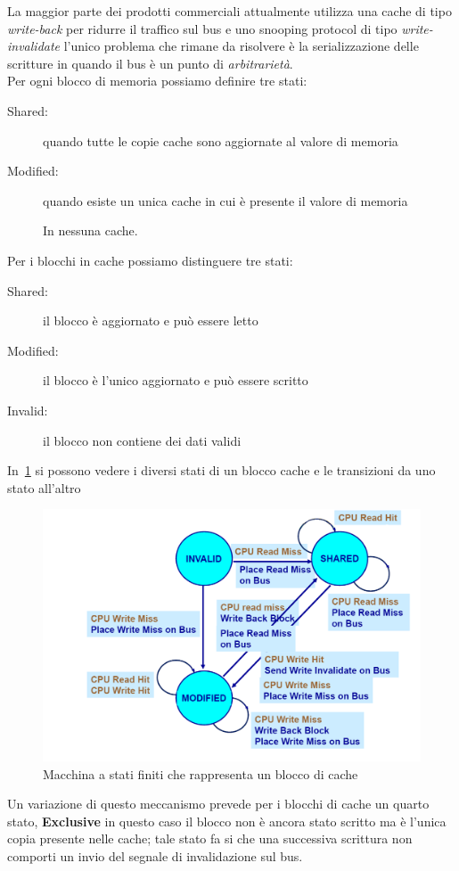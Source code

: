 La maggior parte dei prodotti commerciali attualmente utilizza una cache di tipo \emph{write-back} per ridurre il traffico sul bus e uno snooping protocol di tipo \emph{write-invalidate} l'unico problema che rimane da risolvere è la serializzazione delle scritture in quando il bus è un punto di \emph{arbitrarietà}.\\
Per ogni blocco di memoria possiamo definire tre stati:
\begin{description}
\item[Shared:] quando tutte le copie cache sono aggiornate al valore di memoria
\item[Modified:] quando esiste un unica cache in cui è presente il valore di memoria
\item[] In nessuna cache.
\end{description}
Per i blocchi in cache possiamo distinguere tre stati:
\begin{description}
\item[Shared:] il blocco è aggiornato e può essere letto
\item[Modified:] il blocco è l'unico aggiornato e può essere scritto
\item[Invalid:] il blocco non contiene dei dati validi 
\end{description}
In \figurename\,\ref{fig:snoopfsm} si possono vedere i diversi stati di un blocco cache e le transizioni da uno stato all'altro
\begin{figure}
\centering
\includegraphics[scale=0.5]{img/snoopfsm.png}
\caption{Macchina a stati finiti che rappresenta un blocco di cache}\label{fig:snoopfsm}
\end{figure}
Un variazione di questo meccanismo prevede per i blocchi di cache un quarto stato, \textbf{Exclusive} in questo caso il blocco non è ancora stato scritto ma è l'unica copia presente nelle cache; tale stato fa si che una successiva scrittura non comporti un invio del segnale di invalidazione sul bus.\\

